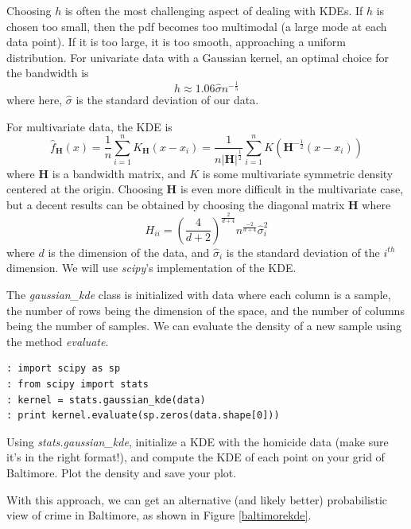 Choosing $h$ is often the most challenging aspect of dealing with KDEs. If $h$ is chosen too small, then the pdf becomes too multimodal (a large mode at each data point). If it is too large, it is too smooth, approaching a uniform distribution. For univariate data with a Gaussian kernel, an optimal choice for the bandwidth is $$h \approx 1.06\widehat{\sigma}n^{-\frac{1}{5}}$$ where here, $\widehat{\sigma}$ is the standard deviation of our data.

For multivariate data, the KDE is $$\widehat{f}_{\mathbf{H}}(x) = \frac{1}{n} \sum_{i=1}^{n} K_{\mathbf{H}}(x - x_{i}) = \frac{1}{n\lvert \mathbf{H} \rvert^{\frac{1}{2}}} \sum_{i=1}^{n} K(\mathbf{H}^{-\frac{1}{2}}(x - x_{i}))$$ where $\mathbf{H}$ is a bandwidth matrix, and $K$ is some multivariate symmetric density centered at the origin. Choosing $\mathbf{H}$ is even more difficult in the multivariate case, but a decent results can be obtained by choosing the diagonal matrix $\mathbf{H}$ where $$H_{ii} = (\frac{4}{d+2})^{\frac{2}{d+4}} n^{\frac{-2}{d+4}} \widehat{\sigma}_{i}^{2}$$ where $d$ is the dimension of the data, and $\widehat{\sigma}_{i}$ is the standard deviation of the $i^{th}$ dimension. We will use \emph{scipy}'s implementation of the KDE.

The \emph{gaussian\_kde} class is initialized with data where each column is a sample, the number of rows being the dimension of the space, and the number of columns being the number of samples. We can evaluate the density of a new sample using the method \emph{evaluate}.

\begin{lstlisting}[style=python]
: import scipy as sp
: from scipy import stats
: kernel = stats.gaussian_kde(data)
: print kernel.evaluate(sp.zeros(data.shape[0]))
\end{lstlisting}

\begin{problem}
Using \emph{stats.gaussian\_kde}, initialize a KDE with the homicide data (make sure it's in the right format!), and compute the KDE of each point on your grid of Baltimore. Plot the density and save your plot.
\end{problem}

With this approach, we can get an alternative (and likely better) probabilistic view of crime in Baltimore, as shown in Figure \ref{baltimorekde}.

